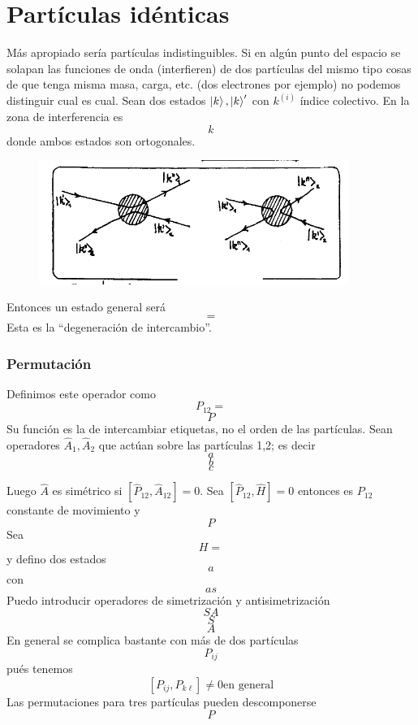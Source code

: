 \documentclass[10pt,oneside]{CBFT_book}
\begin{document}
\chapter{Partículas idénticas}

Más apropiado sería partículas indistinguibles. Si en algún punto del espacio se solapan las funciones de 
onda (interfieren) de dos partículas del mismo tipo cosas de que tenga misma masa, carga, etc. (dos 
electrones por ejemplo) no podemos distinguir cual es cual. Sean dos estados $\Ket{k},\Ket{k}'$ con $k^{(i)}$ 
índice colectivo. En la zona de interferencia es 
\[
	k
\]
donde ambos estados son ortogonales. 

\begin{figure}[htb]
	\begin{center}
	\includegraphics[width=0.9\textwidth]{images/teo2_29.pdf}
	\end{center}
	\caption{}
\end{figure} 
Entonces un estado general será
\[
	=
\]
Esta es la ``degeneración de intercambio''.

\subsection{Permutación}

Definimos este operador como 
\[
	P_{12} =
\]
\[
	P
\]
Su función es la de intercambiar etiquetas, no el orden de las partículas.
Sean operadores $\hat{A}_1,\hat{A}_2$ que actúan sobre las partículas 1,2; es decir 
\[
	a
\]
\[
	b
\]
\[
	c
\]

Luego $\hat{A}$ es simétrico si $[\hat{P}_{12},\hat{A}_{12}]=0$. Sea $[\hat{P}_{12},\hat{H}]=0$ entonces es 
$P_{12}$ constante de movimiento y 
\[
	P
\]
Sea 
\[
	H = 
\]
y defino dos estados
\[
	a
\]
con 
\[
	as
\]
Puedo introducir operadores de simetrización y antisimetrización 
\[
	S A
\]
\[
	S
\]
\[
	A
\]
En general se complica bastante con más de dos partículas 
\[
	P_{ij}
\]
pués tenemos 
\[
	[P_{ij},P_{k\ell}] \neq 0 \text{en general}
\]
Las permutaciones para tres partículas pueden descomponerse 
\[
	P
\]
\end{document}
